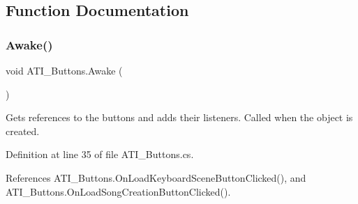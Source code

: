 \subsection{Function Documentation}
\mbox{\label{group___a_t_i_buttons_unity_gaa24ae34a40539dab6595d1713fc77560}} 
\subsubsection{\texorpdfstring{Awake()}{Awake()}}
{\footnotesize\ttfamily void A\+T\+I\+\_\+\+Buttons.\+Awake (\begin{DoxyParamCaption}{ }\end{DoxyParamCaption})\hspace{0.3cm}{\ttfamily [private]}}



Gets references to the buttons and adds their listeners. Called when the object is created. 



Definition at line 35 of file A\+T\+I\+\_\+\+Buttons.\+cs.



References A\+T\+I\+\_\+\+Buttons.\+On\+Load\+Keyboard\+Scene\+Button\+Clicked(), and A\+T\+I\+\_\+\+Buttons.\+On\+Load\+Song\+Creation\+Button\+Clicked().


